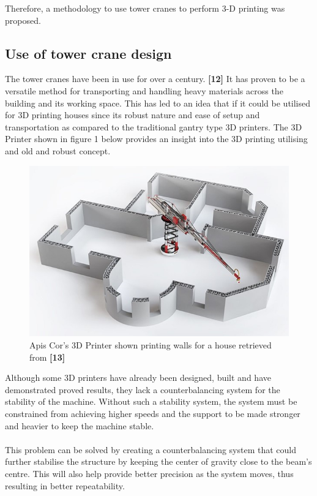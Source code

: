 \documentclass{UoNMCHA}
\numberwithin{equation}{section}
\begin{document}
	Therefore, a methodology to use tower cranes to perform 3-D printing was proposed.
	
	\subsection*{Use of tower crane design}
	
	The tower cranes have been in use for over a century. \textbf{[12]} It has proven to be a versatile method for transporting and handling heavy materials across the building and its working space. This has led to an idea that if it could be utilised for 3D printing houses since its robust nature and ease of setup and transportation as compared to the traditional gantry type 3D printers. The 3D Printer shown in figure 1 below provides an insight into the 3D printing utilising and old and robust concept. \\
	
	\begin{figure}[H]
		\begin{center}
			\includegraphics[width=.75\linewidth]{figs/Picture37}
			\caption{Apis Cor's 3D Printer shown printing walls for a house retrieved from \textbf{[13]}}
			\label{figs/Picture37}
		\end{center}
	\end{figure}
	
	Although some 3D printers have already been designed, built and have demonstrated proved results, they lack a counterbalancing system for the stability of the machine. Without such a stability system, the system must be constrained from achieving higher speeds and the support to be made stronger and heavier to keep the machine stable. \\ \\
	This problem can be solved by creating a counterbalancing system that could further stabilise the structure by keeping the center of gravity close to the beam's centre. This will also help provide better precision as the system moves, thus resulting in better repeatability.
	
\end{document}

